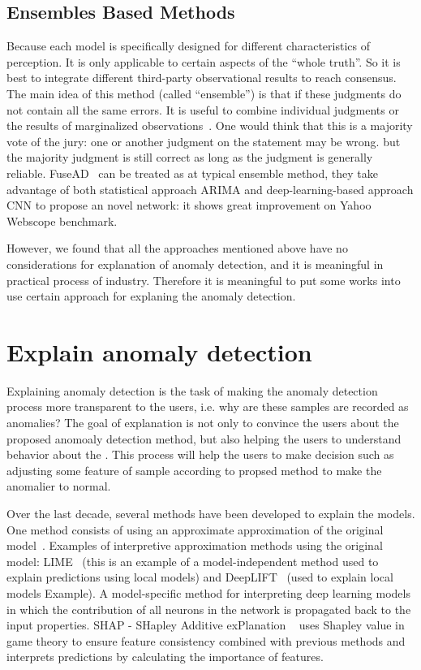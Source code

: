 \subsection{Ensembles Based Methods}

Because each model is specifically designed
for different characteristics of perception.
It is only applicable to certain aspects of
the ``whole truth''.
So it is best to integrate different
third-party observational results to reach consensus.
The main idea of this method (called ``ensemble'')
is that if these judgments do not contain all the same errors.
It is useful to combine individual judgments or
the results of marginalized observations~\cite{zhou2012ensemble}.
One would think that this is a majority vote of
the jury:
one or another judgment on the statement may be wrong.
but the majority judgment is still correct as long as
the judgment is generally reliable.
FuseAD~\cite{munir2019fusead} can be treated as
at typical ensemble method, 
they take advantage of both statistical approach ARIMA 
and deep-learning-based approach 
CNN to propose an novel network: 
it shows great improvement on Yahoo Webscope benchmark.

However, 
we found that all the approaches mentioned above 
have no considerations for explanation of anomaly detection, 
and it is meaningful in practical process of industry. 
Therefore it is meaningful to put some works into use 
certain approach for explaning the  anomaly detection.


\section{Explain anomaly detection}
\label{sec-explain_anomaly}
Explaining anomaly detection is the task of making
the anomaly detection process more transparent to the users,
i.e. why are these samples are recorded as anomalies?
The  goal of explanation is not only to
convince the users about the proposed anomoaly detection method,
but also helping the users to understand behavior about
the .
This process will help the users to make decision such as
adjusting some feature of sample according to propsed method to
make the anomalier to normal.

Over the last decade,
several methods have been developed to explain the models.
One method consists of using an approximate approximation of 
the original model~\cite{lundberg2017unified}.
Examples of interpretive approximation methods using
the original model: 
LIME~\cite{ribeiro2016should} 
(this is an example of a model-independent method 
used to explain predictions using local models) and 
DeepLIFT~\cite{shrikumar2017learning} 
(used to explain local models Example).
A model-specific method for interpreting deep learning models 
in which the contribution of all neurons in the network is 
propagated back to the input properties.
SHAP - SHapley Additive exPlanation ~\cite{lundberg2017unified} uses 
Shapley value in game theory to ensure feature consistency combined
with previous methods and 
interprets predictions by calculating the importance of features.


